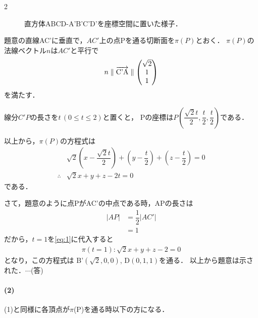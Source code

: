 \documentclass[../../main.tex]{subfiles}
\begin{document}
\begin{multicols}{2}
\begin{figure}[H]
    \caption{直方体ABCD-A'B'C'D'を座標空間に置いた様子．}
    \label{2000-4:fig:1}
  \end{figure}

  題意の直線AC'に垂直で，$AC'$上の点Pを通る切断面を$\pi(P)$とおく．
  $\pi(P)$の法線ベクトル$n$は$AC'$と平行で
  \begin{align}
    n \parallel \overrightarrow{\text{C'A}} \parallel \mqty(\sqrt{2} \\ 1 \\ 1 )
  \end{align}
  を満たす．

  線分$C'P$の長さを$t\, (0\le t\le 2)$と置くと，
  Pの座標は$P\left(\dfrac{\sqrt{2}t}{2},\dfrac{t}{2},\dfrac{t}{2}\right)$である．

  以上から，$\pi(P)$の方程式は
  \begin{align}
    & \sqrt{2}\left(x - \dfrac{\sqrt{2}t}{2} \right) + \left(y - \dfrac{t}{2}\right) + \left(z - \dfrac{t}{2}\right) = 0 \\
    \therefore
    & \sqrt{2}x + y + z - 2t = 0 \label{eq:1}
  \end{align}
  である．

  さて，題意のように点PがAC'の中点である時，APの長さは
  \begin{align}
    |AP|
    & = \dfrac{1}{2}|AC'| \\
    & = 1
  \end{align}
  だから，$t=1$を\cref{eq:1}に代入すると
  \begin{align}
    \pi(t=1): \sqrt{2}x + y + z - 2 = 0
  \end{align}
  となり，この方程式は
  B'$(\sqrt{2},0,0)$, D$(0,1,1)$を通る．
  以上から題意は示された．$\cdots$(答)

  \paragraph{(2)}
  (1)と同様に各頂点が$\pi$(P)を通る時以下の方になる．


\end{multicols}
\end{document}
